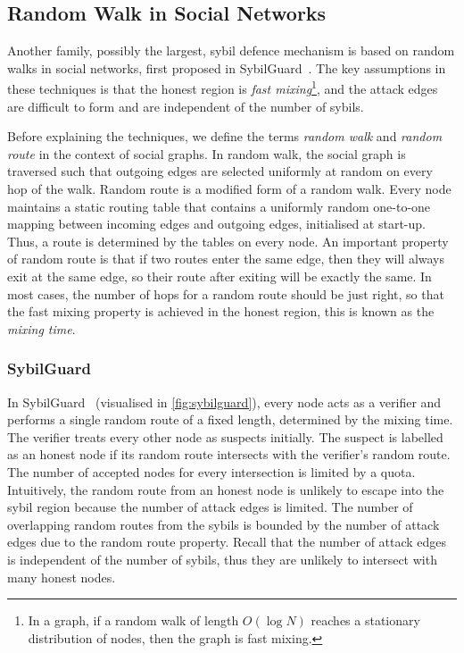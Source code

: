 \subsection{Random Walk in Social Networks}\label{sec:random-walk}
Another family, possibly the largest, sybil defence mechanism is based on random
walks in social networks, first proposed in SybilGuard~\cite{yu2006sybilguard}.
The key assumptions in these techniques is that the honest region is \emph{fast
  mixing}\footnote{In a graph, if a random walk of length $O(\log{N})$ reaches a
  stationary distribution of nodes, then the graph is fast mixing.}, and the
attack edges are difficult to form and are independent of the number of sybils.


Before explaining the techniques, we define the terms \emph{random walk} and
\emph{random route} in the context of social graphs. In random walk, the social
graph is traversed such that outgoing edges are selected uniformly at random on
every hop of the walk. Random route is a modified form of a random walk. Every
node maintains a static routing table that contains a uniformly random
one-to-one mapping between incoming edges and outgoing edges, initialised at
start-up. Thus, a route is determined by the tables on every node. An important
property of random route is that if two routes enter the same edge, then they
will always exit at the same edge, so their route after exiting will be exactly
the same. In most cases, the number of hops for a random route should be just
right, so that the fast mixing property is achieved in the honest region, this
is known as the \emph{mixing time}.

\subsubsection{SybilGuard}
In SybilGuard~\cite{yu2006sybilguard} (visualised in \autoref{fig:sybilguard}),
every node acts as a verifier and performs a single random route of a fixed
length, determined by the mixing time. The verifier treats every other node as
suspects initially. The suspect is labelled as an honest node if its random
route intersects with the verifier's random route. The number of accepted nodes
for every intersection is limited by a quota. Intuitively, the random route from
an honest node is unlikely to escape into the sybil region because the number of
attack edges is limited. The number of overlapping random routes from the sybils
is bounded by the number of attack edges due to the random route property.
Recall that the number of attack edges is independent of the number of sybils,
thus they are unlikely to intersect with many honest nodes.


